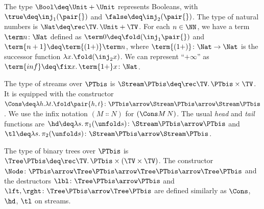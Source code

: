 \begin{example}
\label{ex:pure}
The type $\Bool \deq \Unit + \Unit$ represents Booleans, 
with $\true \deq \inj_1(\pair{})$
and $\false \deq \inj_2(\pair{})$.
The type of natural numbers
is $\Nat \deq \rec \TV.\, \Unit + \TV$.
For each $n \in \NN$, we have a term $\term n \colon \Nat$
defined as $\term 0 \deq \fold(\inj_1 \pair{})$
and $\term{n+1} \deq \term{(1+)} \term n$,
where $\term{(1+)} \colon \Nat \to \Nat$
is the successor function $\lambda x. \fold(\inj_2 x)$.
We can represent ``$+\infty$'' as
$\term{inf} \deq \fix x.\, \term{1+}x \colon \Nat$.

The type of streams over $\PTbis$ is
$\Stream\PTbis \deq \rec\TV.\, \PTbis \times \TV$.
It is equipped with the constructor
\(
  \Cons
  \deq
  \lambda h .\lambda t.\fold \pair{h,t}
  \colon
  \PTbis \arrow \Stream\PTbis \arrow \Stream \PTbis
\).
We use the infix notation $(M \Colon N)$ for $(\Cons M\, N)$.
The usual \emph{head} and \emph{tail} functions
are
$\hd \deq \lambda s.\, \pi_1 (\unfold s) \colon \Stream\PTbis \arrow \PTbis$
and
$\tl \deq \lambda s.\, \pi_2 (\unfold s) \colon \Stream\PTbis \arrow \Stream\PTbis$.

The type of binary trees over $\PTbis$ is
$\Tree\PTbis \deq \rec\TV.\, \PTbis \times (\TV \times \TV)$.
The constructor
$\Node \colon \PTbis \arrow \Tree\PTbis \arrow \Tree\PTbis \arrow \Tree\PTbis$
and the destructors
$\lbl \colon \Tree\PTbis \arrow \PTbis$
and
$\lft, \rght \colon \Tree\PTbis \arrow \Tree\PTbis$
are defined similarly as $\Cons$, $\hd$, $\tl$ on streams.
\lipicsEnd
\end{example}



